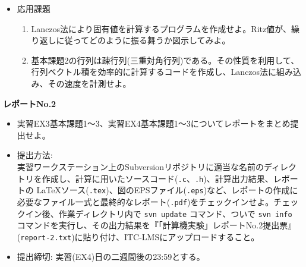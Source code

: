 \documentclass[11pt]{jarticle}
\begin{document}
\begin{itemize}
\item 応用課題
  \begin{enumerate}
  \item Lanczos法により固有値を計算するプログラムを作成せよ。Ritz値が、繰り返しに従ってどのように振る舞うか図示してみよ。
  \item 基本課題2の行列は疎行列(三重対角行列)である。その性質を利用して、行列ベクトル積を効率的に計算するコードを作成し、Lanczos法に組み込み、その速度を計測せよ。
  \end{enumerate}  
\end{itemize}

\noindent
{\bf\large レポートNo.2}
\noindent
\begin{itemize}
\item 実習EX3基本課題1〜3、実習EX4基本課題1〜3についてレポートをまとめ提出せよ。
\item 提出方法: \\
  実習ワークステーション上のSubversionリポジトリに適当な名前のディレクトリを作成し、計算に用いたソースコード({\tt *.c}、{\tt *.h})、計算出力結果、レポートの \LaTeX ソース({\tt *.tex})、図のEPSファイル({\tt *.eps})など、レポートの作成に必要なファイル一式と最終的なレポート({\tt *.pdf})をチェックインせよ。チェックイン後、作業ディレクトリ内で {\tt svn update} コマンド、ついで {\tt svn info} コマンドを実行し、その出力結果を『「計算機実験」レポートNo.2提出票』({\tt report-2.txt})に貼り付け、ITC-LMSにアップロードすること。
\item 提出締切: 実習(EX4)日の二週間後の23:59とする。
\end{itemize}
\end{document}

